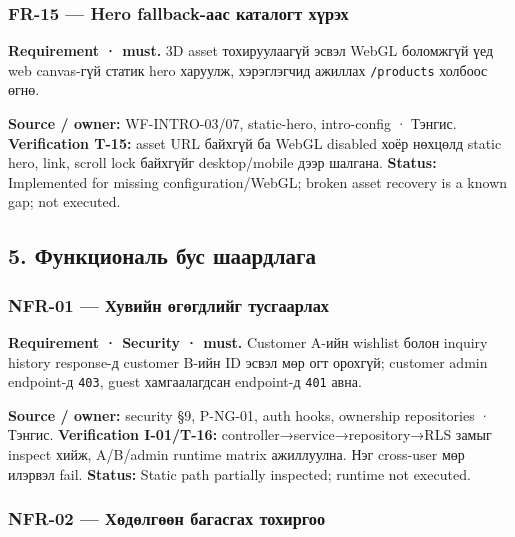 \documentclass[
  mongolian,
]{article}
\begin{document}
\subsubsection{FR-15 --- Hero fallback-аас каталогт
хүрэх}\label{fr-15-hero-fallback-ux430ux430ux441-ux43aux430ux442ux430ux43bux43eux433ux442-ux445ux4afux440ux44dux445}

\textbf{Requirement · must.} 3D asset тохируулаагүй эсвэл WebGL
боломжгүй үед web canvas-гүй статик hero харуулж, хэрэглэгчид ажиллах
\texttt{/products} холбоос өгнө.

\textbf{Source / owner:} WF-INTRO-03/07, static-hero, intro-config ·
Тэнгис. \textbf{Verification T-15:} asset URL байхгүй ба WebGL disabled
хоёр нөхцөлд static hero, link, scroll lock байхгүйг desktop/mobile дээр
шалгана. \textbf{Status:} Implemented for missing configuration/WebGL;
broken asset recovery is a known gap; not executed.

\subsection{5. Функциональ бус
шаардлага}\label{ux444ux443ux43dux43aux446ux438ux43eux43dux430ux43bux44c-ux431ux443ux441-ux448ux430ux430ux440ux434ux43bux430ux433ux430}

\subsubsection{NFR-01 --- Хувийн өгөгдлийг
тусгаарлах}\label{nfr-01-ux445ux443ux432ux438ux439ux43d-ux4e9ux433ux4e9ux433ux434ux43bux438ux439ux433-ux442ux443ux441ux433ux430ux430ux440ux43bux430ux445}

\textbf{Requirement · Security · must.} Customer A-ийн wishlist болон
inquiry history response-д customer B-ийн ID эсвэл мөр огт орохгүй;
customer admin endpoint-д \texttt{403}, guest хамгаалагдсан endpoint-д
\texttt{401} авна.

\textbf{Source / owner:} security §9, P-NG-01, auth hooks, ownership
repositories · Тэнгис. \textbf{Verification I-01/T-16:}
controller→service→repository→RLS замыг inspect хийж, A/B/admin runtime
matrix ажиллуулна. Нэг cross-user мөр илэрвэл fail. \textbf{Status:}
Static path partially inspected; runtime not executed.

\subsubsection{NFR-02 --- Хөдөлгөөн багасгах
тохиргоо}\label{nfr-02-ux445ux4e9ux434ux4e9ux43bux433ux4e9ux4e9ux43d-ux431ux430ux433ux430ux441ux433ux430ux445-ux442ux43eux445ux438ux440ux433ux43eux43e}
\end{document}
